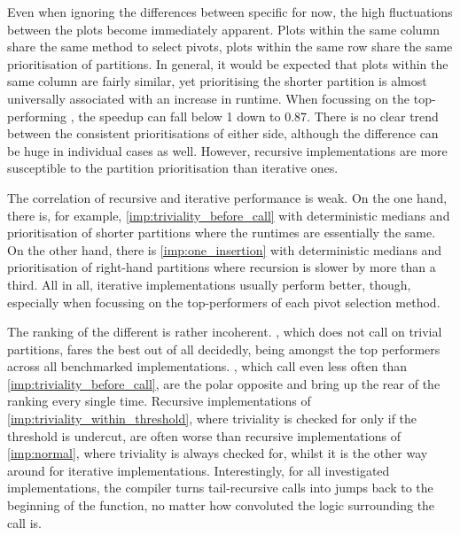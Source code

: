 Even when ignoring the differences between specific  for now, the high fluctuations between the plots become immediately apparent.
Plots within the same column share the same method to select pivots, plots within the same row share the same prioritisation of partitions.
In general, it would be expected that plots within the same column are fairly similar, yet prioritising the shorter partition is almost universally associated with an increase in runtime.
When focussing on the top-performing , the speedup can fall below \num{1} down to \num{0.87}.
There is no clear trend between the consistent prioritisations of either side, although the difference can be huge in individual cases as well.
However, recursive implementations are more susceptible to the partition prioritisation than iterative ones.

The correlation of recursive and iterative performance is weak.
On the one hand, there is, for example, \cref{imp:triviality_before_call} with deterministic medians and prioritisation of shorter partitions where the runtimes are essentially the same.
On the other hand, there is \cref{imp:one_insertion} with deterministic medians and prioritisation of right-hand partitions where recursion is slower by more than a third.
All in all, iterative implementations usually perform better, though, especially when focussing on the top-performers of each pivot selection method.

The ranking of the different  is rather incoherent.
, which does not call \QS{} on trivial partitions, fares the best out of all  decidedly, being amongst the top performers across all benchmarked implementations.
, which call \QS{} even less often than \cref{imp:triviality_before_call}, are the polar opposite and bring up the rear of the ranking every single time.
Recursive implementations of \cref{imp:triviality_within_threshold}, where triviality is checked for only if the threshold is undercut, are often worse than recursive implementations of \cref{imp:normal}, where triviality is always checked for, whilst it is the other way around for iterative implementations.
Interestingly, for all investigated implementations, the compiler turns tail-recursive calls into jumps back to the beginning of the function, no matter how convoluted the logic surrounding the call is.

